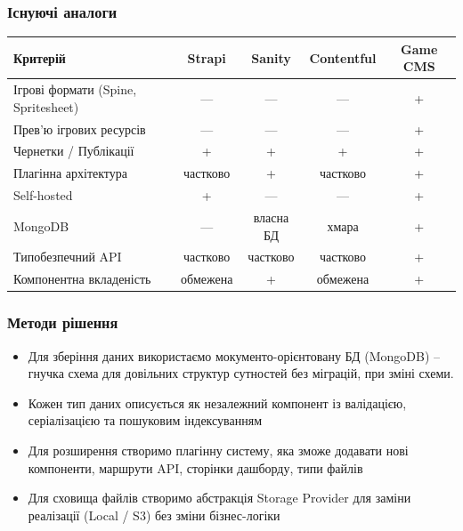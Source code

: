 \documentclass[aspectratio=169]{beamer}
\begin{document}
\begin{frame}
\frametitle{Існуючі аналоги}
  \begin{table}
    \footnotesize
    \begin{tabular}{l|c|c|c|c}
      \textbf{Критерій}                   & \textbf{Strapi} & \textbf{Sanity} & \textbf{Contentful} & \textbf{Game CMS} \\
      \hline
      Ігрові формати (Spine, Spritesheet) & ---             & ---             & ---                 & + \\
      Прев'ю ігрових ресурсів             & ---             & ---             & ---                 & + \\
      Чернетки / Публікації               & +               & +               & +                   & + \\
      Плагінна архітектура                & частково        & +               & частково            & + \\
      Self-hosted                         & +               & ---             & ---                 & + \\
      MongoDB                             & ---             & власна БД       & хмара               & + \\
      Типобезпечний API                   & частково        & частково        & частково            & + \\
      Компонентна вкладеність             & обмежена        & +               & обмежена            & + \\
    \end{tabular}
  \end{table}
\end{frame}

\begin{frame}
\frametitle{Методи рішення}
  \begin{itemize}
    \item Для зберіння даних використаємо мокументо-орієнтовану БД (MongoDB) -- гнучка схема для довільних структур сутностей без міграцій, при зміні схеми.
    \item Кожен тип даних описується як незалежний компонент із валідацією, серіалізацією та пошуковим індексуванням
    \item Для розширення створимо плагінну систему, яка зможе додавати нові компоненти, маршрути API, сторінки дашборду, типи файлів
    \item Для сховища файлів створимо абстракція Storage Provider для заміни реалізації (Local / S3) без зміни бізнес-логіки
  \end{itemize}
\end{frame}
\end{document}
